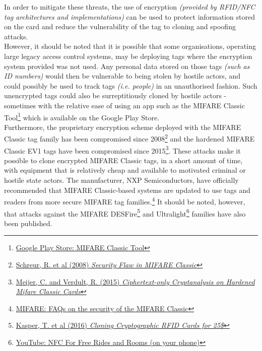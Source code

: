 \noindent In order to mitigate these threats, the use of encryption \textit{(provided by RFID/NFC tag architectures and implementations)} can be used to protect information stored on the card and reduce the vulnerability of the tag to cloning and spoofing attacks.\\

\noindent However, it should be noted that it is possible that some organisations, operating large legacy access control systems, may be deploying tags where the encryption system provided was not used. Any personal data stored on those tags \textit{(such as ID numbers)} would then be vulnerable to being stolen by hostile actors, and could possibly be used to track tags \textit{(i.e. people)} in an unauthorised fashion. Such unencrypted tags could also be surreptitiously cloned by hostile actors - sometimes with the relative ease of using an app such as the MIFARE Classic Tool\footnote{\href{https://play.google.com/store/apps/details?id=de.syss.MifareClassicTool&hl=en_GB&rdid=de.syss.MifareClassicTool}{Google Play Store: MIFARE Classic Tool}} which is available on the Google Play Store.\\

\noindent Furthermore, the proprietary encryption scheme deployed with the MIFARE Classic tag family has been compromised since 2008\footnote{\href{http://www.cs.ru.nl/~flaviog/publications/Security_Flaw_in_MIFARE_Classic.pdf}{Schreur, R. et al (2008) \textit{Security Flaw in MIFARE Classic}}} and the hardened MIFARE Classic EV1 tags have been compromised since 2015\footnote{\href{http://cs.ru.nl/~rverdult/Ciphertext-only_Cryptanalysis_on_Hardened_Mifare_Classic_Cards-CCS_2015.pdf}{Meijer, C. and Verdult, R. (2015) \textit{Ciphertext-only Cryptanalysis on Hardened Mifare Classic Cards}}}. These attacks make it possible to clone encrypted MIFARE Classic tags, in a short amount of time, with equipment that is relatively cheap and available to motivated criminal or hostile state actors. The manufacturer, NXP Semiconductors, have officially recommended that MIFARE Classic-based systems are updated to use tags and readers from more secure MIFARE tag families.\footnote{\href{https://www.mifare.net/en/products/chip-card-ics/mifare-classic/frequently-asked-questions/}{MIFARE: FAQs on the security of the MIFARE Classic}} It should be noted, however, that attacks against the MIFARE DESFire\footnote{\href{http://www.proxmark.org/files/Documents/13.56\%20MHz\%20-\%20MIFARE\%20DESFire/Cloning_Cryptographic_RFID_Cards_for_25USD-WISSEC_2010.pdf}{Kasper, T. et al (2016) \textit{Cloning Cryptographic RFID Cards for 25\$}}} and Ultralight\footnote{\href{https://www.youtube.com/watch?v=-uvvVMHnC3c}{YouTube: NFC For Free Rides and Rooms (on your phone)}} families have also been published.\\


